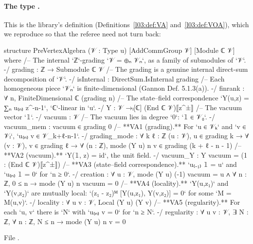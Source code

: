 \paragraph{The type .}  This is the library's definition
(Definitions~\ref{l03:def:VA} and~\ref{l03:def:VOA}), which we reproduce so that the referee need not turn back:
\begin{leancode}
structure PreVertexAlgebra (𝒱 : Type u) [AddCommGroup 𝒱] [Module ℂ 𝒱] where
  /-- The internal `ℤ`-grading `𝒱 = ⊕ₙ 𝒱ₙ`, as a family of submodules of `𝒱`. -/
  grading : ℤ → Submodule ℂ 𝒱
  /-- The grading is a genuine internal direct-sum decomposition of `𝒱`. -/
  isInternal : DirectSum.IsInternal grading
  /-- Each homogeneous piece `𝒱ₙ` is finite-dimensional (Gannon Def. 5.1.3(a)). -/
  finrank : ∀ n, FiniteDimensional ℂ (grading n)
  /-- The state–field correspondence `Y(u,z) = ∑ₙ u₍ₙ₎ z^{-n-1}`, `ℂ`-linear in `u`. -/
  Y : 𝒱 →ₗ[ℂ] (End ℂ 𝒱)⟦z^±⟧
  /-- The vacuum vector `𝟙`. -/
  vacuum : 𝒱
  /-- The vacuum lies in degree `0`: `𝟙 ∈ 𝒱₀`. -/
  vacuum_mem : vacuum ∈ grading 0
  /-- **VA1 (grading).** For `u ∈ 𝒱ₖ` and `v ∈ 𝒱ₗ`, `u₍ₙ₎ v ∈ 𝒱_{k+ℓ-n-1}`. -/
  grading_mode : ∀ {k ℓ : ℤ} (u : 𝒱), u ∈ grading k → ∀ (v : 𝒱), v ∈ grading ℓ →
    ∀ (n : ℤ), mode (Y u) n v ∈ grading (k + ℓ - n - 1)
  /-- **VA2 (vacuum).** `Y(𝟙, z) = id`, the unit field. -/
  vacuum_Y : Y vacuum = (1 : (End ℂ 𝒱)⟦z^±⟧)
  /-- **VA3 (state–field correspondence).** `u₍₋₁₎ 𝟙 = u` and `u₍ₙ₎ 𝟙 = 0` for `n ≥ 0`. -/
  creation : ∀ u : 𝒱, mode (Y u) (-1) vacuum = u ∧ ∀ n : ℤ, 0 ≤ n → mode (Y u) n vacuum = 0
  /-- **VA4 (locality).** `Y(u,z₁)` and `Y(v,z₂)` are mutually local:
  `(z₁ - z₂)ᴹ [Y(u,z₁), Y(v,z₂)] = 0` for some `M = M(u,v)`. -/
  locality : ∀ u v : 𝒱, Local (Y u) (Y v)
  /-- **VA5 (regularity).** For each `u, v` there is `N` with `u₍ₙ₎ v = 0` for `n ≥ N`. -/
  regularity : ∀ u v : 𝒱, ∃ N : ℤ, ∀ n : ℤ, N ≤ n → mode (Y u) n v = 0
\end{leancode}
File .
